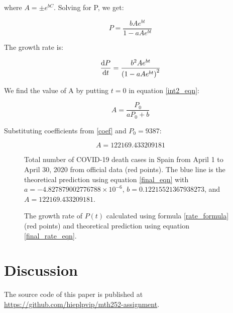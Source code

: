\documentclass[12pt]{article}
\begin{document}
where $A = \pm e^{bC}$. Solving for P, we get:

\begin{equation} \label{final_eqn}
P = \frac{bAe^{bt}}{1 - aAe^{bt}}
\end{equation}

The growth rate is:

\begin{equation} \label{final_rate_eqn}
\diff{P}{t} = \frac{b^2Ae^{bt}}{\left ( 1 - aAe^{bt} \right ) ^2}
\end{equation}

We find the value of A by putting $t = 0$ in equation \ref{int2_eqn}:

\begin{equation*}
A = \frac{P_0}{aP_0 + b}
\end{equation*}

Substituting coefficients from \ref{coef} and $P_0 = 9387$:

\begin{equation*}
A = 122169.433209181
\end{equation*}

\begin{figure}[H]
  \begin{center}
    
  \end{center}
  \caption{Total number of COVID-19 death cases in Spain from April 1 to
  April 30, 2020 from official data (red points). The blue line is the
  theoretical prediction using equation \ref{final_eqn} with
  $a = -4.827879002776788 \times 10^{-6}$,
  $b = 0.12215521367938273$, and $A = 122169.433209181$.}
\end{figure}

\begin{figure}[H]
  \begin{center}
    
  \end{center}
  \caption{The growth rate of $P(t)$ calculated using formula \ref{rate_formula} (red points)
  and theoretical prediction using equation \ref{final_rate_eqn}.}
\end{figure}

\section*{Discussion}

The source code of this paper is published at
\url{https://github.com/hieplpvip/mth252-assignment}.

\printbibliography
\end{document}
